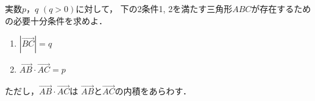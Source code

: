 \documentclass[../../main.tex]{subfiles}
\begin{document}
実数$p$，$q$ $(q>0)$に対して，
下の2条件1, 2を満たす三角形$ABC$が存在するための必要十分条件を求めよ．
\begin{enumerate}
  \item [1] $|\overrightarrow{BC}|=q$
  \item [2] $\overrightarrow{AB}\cdot\overrightarrow{AC}=p$
\end{enumerate}
ただし，$\overrightarrow{AB}\cdot\overrightarrow{AC}$は
$\overrightarrow{AB}$と$\overrightarrow{AC}$の内積をあらわす．
\end{document}
